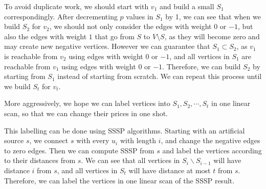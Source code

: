 \begin{center}
\end{center}

To avoid duplicate work, we should start with $v_1$ and build a small $S_1$ correspondingly. After decrementing $p$ values in $S_1$ by 1, we can see that when we build $S_2$ for $v_2$, we should not only consider the edges with weight $0$ or $-1$, but also the edges with weight $1$ that go from $S$ to $V\setminus S$, as they will become zero and may create new negative vertices. However we can guarantee that $S_1 \subset S_2$, as $v_1$ is reachable from $v_2$ using edges with weight $0$ or $-1$, and all vertices in $S_1$ are reachable from $v_1$ using edges with weight $0$ or $-1$. Therefore, we can build $S_2$ by starting from $S_1$ instead of starting from scratch. We can repeat this process until we build $S_t$ for $v_t$.

More aggressively, we hope we can label vertices into $S_1, S_2, \cdots, S_t$ in one linear scan, so that we can change their prices in one shot.

This labelling can be done using SSSP algorithms. Starting with an artificial source $s$, we connect $s$ with every $u_i$ with length $i$, and change the negative edges to zero edges. Then we can compute SSSP from $s$ and label the vertices according to their distances from $s$. We can see that all vertices in $S_i \backslash S_{i-1}$ will have distance $i$ from $s$, and all vertices in $S_t$ will have distance at most $t$ from $s$. Therefore, we can label the vertices in one linear scan of the SSSP result.

